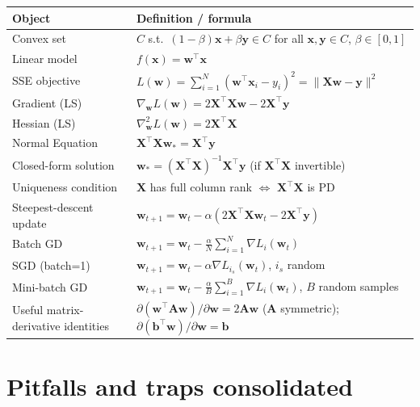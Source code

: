 \documentclass[11pt, a4paper]{article}
\newcommand{\thead}[1]{\textbf{#1}}
\begin{document}
\begin{tabularx}{\linewidth}{@{}lX@{}}
\toprule
\thead{Object} & \thead{Definition / formula} \\
\midrule
Convex set        & $C$ s.t.\ $(1-\beta)\mathbf{x}+\beta\mathbf{y}\in C$ for all $\mathbf{x},\mathbf{y}\in C$, $\beta\in[0,1]$ \\
Linear model      & $f(\mathbf{x}) = \mathbf{w}^\top\mathbf{x}$ \\
SSE objective     & $L(\mathbf{w}) = \sum_{i=1}^N (\mathbf{w}^\top\mathbf{x}_i - y_i)^2 = \|\mathbf{X}\mathbf{w}-\mathbf{y}\|^2$ \\
Gradient (LS)     & $\nabla_\mathbf{w} L(\mathbf{w}) = 2\mathbf{X}^\top\mathbf{X}\mathbf{w} - 2\mathbf{X}^\top\mathbf{y}$ \\
Hessian (LS)      & $\nabla^2_\mathbf{w} L(\mathbf{w}) = 2\mathbf{X}^\top\mathbf{X}$ \\
Normal Equation   & $\mathbf{X}^\top\mathbf{X}\mathbf{w}_* = \mathbf{X}^\top\mathbf{y}$ \\
Closed-form solution & $\mathbf{w}_* = (\mathbf{X}^\top\mathbf{X})^{-1}\mathbf{X}^\top\mathbf{y}$ (if $\mathbf{X}^\top\mathbf{X}$ invertible) \\
Uniqueness condition & $\mathbf{X}$ has full column rank $\Leftrightarrow$ $\mathbf{X}^\top\mathbf{X}$ is PD \\
Steepest-descent update & $\mathbf{w}_{t+1} = \mathbf{w}_t - \alpha(2\mathbf{X}^\top\mathbf{X}\mathbf{w}_t - 2\mathbf{X}^\top\mathbf{y})$ \\
Batch GD          & $\mathbf{w}_{t+1} = \mathbf{w}_t - \frac{\alpha}{N}\sum_{i=1}^N \nabla L_i(\mathbf{w}_t)$ \\
SGD (batch=1)     & $\mathbf{w}_{t+1} = \mathbf{w}_t - \alpha\nabla L_{i_s}(\mathbf{w}_t)$, $i_s$ random \\
Mini-batch GD     & $\mathbf{w}_{t+1} = \mathbf{w}_t - \frac{\alpha}{B}\sum_{i=1}^B \nabla L_i(\mathbf{w}_t)$, $B$ random samples \\
Useful matrix-derivative identities & $\partial(\mathbf{w}^\top\mathbf{A}\mathbf{w})/\partial\mathbf{w} = 2\mathbf{A}\mathbf{w}$ ($\mathbf{A}$ symmetric); $\partial(\mathbf{b}^\top\mathbf{w})/\partial\mathbf{w} = \mathbf{b}$ \\
\bottomrule
\end{tabularx}

\section*{Pitfalls and traps consolidated}
\end{document}
